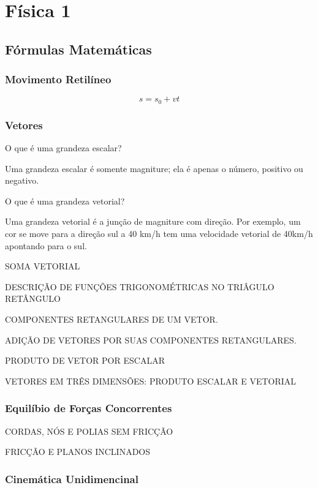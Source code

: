 \chapter{Física 1}
\section{Fórmulas Matemáticas}

\subsection{Movimento Retilíneo}

\begin{equation}\label{14.1}
    s=s_0+vt
\end{equation}

\subsection{Vetores}

O que é uma grandeza escalar?

Uma grandeza escalar é somente magniture; ela é apenas o número, positivo ou negativo.

O que é uma grandeza vetorial?

Uma grandeza vetorial é a junção de magniture com direção. Por exemplo, um cor se move para a direção sul a 40 km/h tem uma velocidade vetorial de 40km/h apontando para o sul.

SOMA VETORIAL

DESCRIÇÃO DE FUNÇÕES TRIGONOMÉTRICAS NO TRIÂGULO RETÂNGULO

COMPONENTES RETANGULARES DE UM VETOR.

ADIÇÃO DE VETORES POR SUAS COMPONENTES RETANGULARES.

PRODUTO DE VETOR POR ESCALAR

VETORES EM TRÊS DIMENSÕES: PRODUTO ESCALAR E VETORIAL

\subsection{Equilíbio de Forças Concorrentes}

CORDAS, NÓS E POLIAS SEM FRICÇÃO

FRICÇÃO E PLANOS INCLINADOS

\subsection{Cinemática Unidimencinal}

